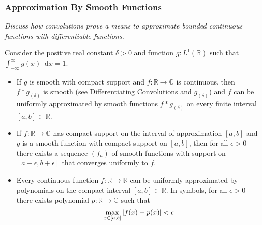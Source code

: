 \documentclass[11pt, a4paper]{article}
\newcommand{\question}[1]{\textit{#1}\vspace{2mm}}
\newcommand{\R}{\mathbb{R}} %
\newcommand{\C}{\mathbb{C}} %
\newcommand{\diff}{\mathop{}\!\mathrm{d}} %
\begin{document}
\subsubsection{Approximation By Smooth Functions}
\question{Discuss how convolutions prove a means to approximate bounded continuous functions with differentiable functions. }

Consider the positive real constant $ \delta > 0 $ and function $ g:L^1(\R) $ such that $ \displaystyle{\int_{-\infty}^{\infty}g(x) \diff x = 1} $.

\begin{itemize}
	\item If $ g $ is smooth with compact support and $ f : \R \to \C $ is continuous, then $ f * g_{(\delta)} $ is smooth (see Differentiating Convolutions and $ g_{(\delta)} $) and $ f $ can be uniformly approximated by smooth functions $ f*g_{(\delta)} $ on every finite interval $ [a, b] \subset \R $. 
		
	\item If $ f : \R \to \C $ has compact support on the interval of approximation $ [a, b] $ and $ g $ is a smooth function with compact support on $ [a, b] $, then for all $ \epsilon > 0 $ there exists a sequence $ (f_n) $ of smooth functions with support on $ [a-\epsilon, b+\epsilon] $ that converges uniformly to $ f $.
	
	\item Every continuous function  $ f:\R \to \R $ can be uniformly approximated by polynomials on the compact interval $ [a, b] \subset \R $. In symbols, for all $ \epsilon > 0 $ there exists polynomial $ p : \R \to \C $ such that
	\begin{equation*}
		\max_{x\in[a, b]} \abs{f(x) - p(x)} < \epsilon
	\end{equation*}
\end{itemize}
\end{document}
